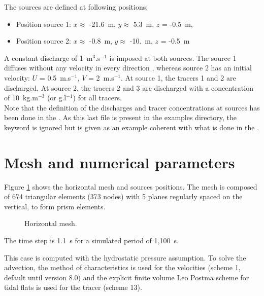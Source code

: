 \bigskip
The sources are defined at following positions:
\begin{itemize}
\item Position source 1: $x \approx$ -21.6~m, $y \approx$ 5.3~m, $z$ = -0.5~m,
\item Position source 2: $x \approx$ -0.8~m, $y \approx$ -10.~m, $z$ = -0.5~m
\end{itemize}
A constant discharge of 1~m$^3$.s$^{-1}$ is imposed at both sources.
The source 1 diffuses without any velocity in every direction , 
whereas source 2 has an initial velocity: 
$U$ = 0.5~m.s$^{-1}$, $V$ = 2~m.s$^{-1}$.
At source 1, the tracers 1 and 2 are discharged. At source 2, 
the tracers 2 and 3 are discharged with a concentration 
of 10~kg.m$^{-3}$ (or g.l$^{-1}$) for all tracers.\\
Note that the definition of the discharges and tracer concentrations at sources
has been done in the .
As this last file is present in the examples directory, the keyword
 is ignored but is given
as an example coherent with what is done in the .

\section{Mesh and numerical parameters}

\bigskip
Figure \ref{t3d:source:fig:meshH} shows the horizontal mesh and sources
positions. The mesh is composed of 674 triangular elements (373 nodes) with 5 planes  
regularly spaced on the vertical, to form prism elements.\\

\begin{figure}[!htbp]
 \centering
 \caption{Horizontal mesh.}
 \label{t3d:source:fig:meshH}
\end{figure}

The time step is 1.1~s for a simulated period of 1,100~s.

\bigskip
This case is computed with the hydrostatic pressure assumption. 
To solve the advection, the method of characteristics 
is used for the velocities (scheme 1, default until version 8.0)
and the explicit finite volume 
Leo Postma scheme for tidal flats is used for the tracer (scheme 13).


